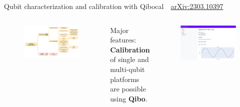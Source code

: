 \documentclass[aspectratio=169, 8pt, xcolor={svgnames}, hyperref={linkcolor=black}]{beamer}
\begin{document}
 \begin{frame}{Qubit characterization and calibration with Qibocal \hfill \faBook\,\, \href{https://arxiv.org/abs/2303.10397}{arXiv:2303.10397}}

   \begin{columns}
     \column{9cm}

   \begin{figure}
     \includegraphics[width=\textwidth]{figures/qpu_characterization.pdf}
   \end{figure}

     \column{6cm}
     \begin{exampleblock}{Major features:}
       \textbf{Calibration} of single and multi-qubit platforms are possible using \textbf{Qibo}.
     \end{exampleblock}
     \begin{figure}
       \includegraphics[width=\textwidth]{figures/qibocal_report.png}
     \end{figure}
   \end{columns}

 \end{frame}
\end{document}
